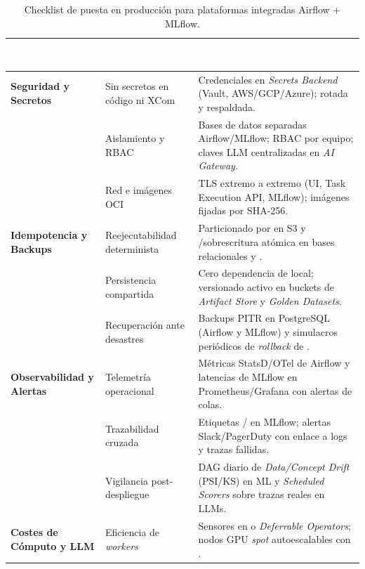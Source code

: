 \begin{table}[htbp]
\centering
\caption{Checklist de puesta en producción para plataformas integradas Airflow + MLflow.}
\label{tab:checklist-produccion}
\footnotesize
\begin{tabularx}{\textwidth}{@{}L{2.4cm} L{4.1cm} Y@{}}
\toprule
{}
\textcolor{white}{\sffamily\bfseries Dimensión} &
\textcolor{white}{\sffamily\bfseries Control obligatorio} &
\textcolor{white}{\sffamily\bfseries Criterio de verificación en producción} \\
\midrule
\textbf{Seguridad y Secretos} &
Sin secretos en código ni XCom &
Credenciales en \textit{Secrets Backend} (Vault, AWS/GCP/Azure);  rotada y respaldada. \\
 &
Aislamiento y RBAC &
Bases de datos separadas Airflow/MLflow; RBAC por equipo; claves LLM centralizadas en \textit{AI Gateway}. \\
 &
Red e imágenes OCI &
TLS extremo a extremo (UI, Task Execution API, MLflow); imágenes  fijadas por SHA-256. \\
\midrule
{}
\textbf{Idempotencia y Backups} &
Reejecutabilidad determinista &
Particionado por  en S3 y /sobrescritura atómica en bases relacionales y . \\
 &
Persistencia compartida &
Cero dependencia de  local; versionado activo en buckets de \textit{Artifact Store} y \textit{Golden Datasets}. \\
 &
Recuperación ante desastres &
Backups PITR en PostgreSQL (Airflow y MLflow) y simulacros periódicos de \textit{rollback} de . \\
\midrule
\textbf{Observabilidad y Alertas} &
Telemetría operacional &
Métricas StatsD/OTel de Airflow y latencias de MLflow en Prometheus/Grafana con alertas de colas. \\
 &
Trazabilidad cruzada &
Etiquetas / en MLflow; alertas Slack/PagerDuty con enlace a logs y trazas fallidas. \\
 &
Vigilancia post-despliegue &
DAG diario de \textit{Data/Concept Drift} (PSI/KS) en ML y \textit{Scheduled Scorers} sobre trazas reales en LLMs. \\
\midrule
{}
\textbf{Costes de Cómputo y LLM} &
Eficiencia de \textit{workers} &
Sensores en  o \textit{Deferrable Operators}; nodos GPU \textit{spot} autoescalables con . \\

\end{tabularx}
\end{table}
